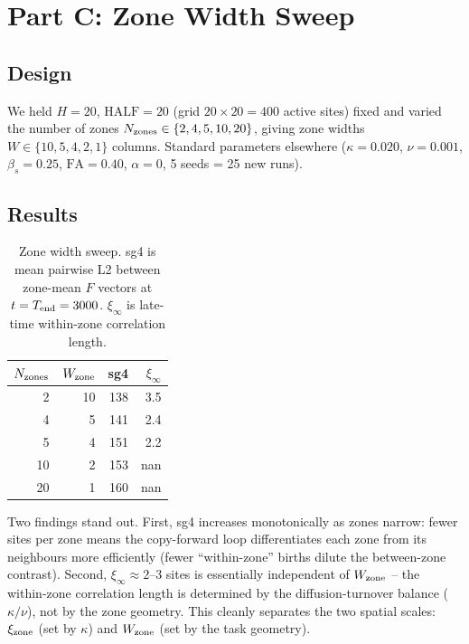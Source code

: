 \documentclass[11pt,a4paper]{article}
\begin{document}
\section{Part C: Zone Width Sweep}
\label{sec:partC}

\subsection{Design}

We held $H=20$, $\mathrm{HALF}=20$ (grid $20 \times 20 = 400$ active sites)
fixed and varied the number of zones $N_{\rm zones} \in \{2, 4, 5, 10, 20\}$,
giving zone widths $W \in \{10, 5, 4, 2, 1\}$ columns.
Standard parameters elsewhere ($\kappa=0.020$, $\nu=0.001$, $\beta_s=0.25$,
$\mathrm{FA}=0.40$, $\alpha=0$, 5 seeds = 25 new runs).

\subsection{Results}

\begin{table}[h]
\centering
\caption{Zone width sweep.  sg4 is mean pairwise L2 between zone-mean $F$
         vectors at $t=T_{\rm end}=3000$.  $\xi_\infty$ is late-time
         within-zone correlation length.}
\label{tab:zones}
\begin{tabular}{rrrr}
\toprule
$N_{\rm zones}$ & $W_{\rm zone}$ & sg4 & $\xi_\infty$ \\
\midrule
 2 & 10 & 138 & 3.5 \\
 4 &  5 & 141 & 2.4 \\
 5 &  4 & 151 & 2.2 \\
10 &  2 & 153 & nan \\
20 &  1 & 160 & nan \\
\bottomrule
\end{tabular}
\end{table}

Two findings stand out.  First, sg4 increases monotonically as zones narrow:
fewer sites per zone means the copy-forward loop differentiates each zone from
its neighbours more efficiently (fewer ``within-zone'' births dilute the
between-zone contrast).  Second, $\xi_\infty \approx 2$--$3$ sites is
essentially independent of $W_{\rm zone}$ -- the within-zone correlation
length is determined by the diffusion-turnover balance ($\kappa/\nu$), not by
the zone geometry.  This cleanly separates the two spatial scales:
$\xi_{\rm zone}$ (set by $\kappa$) and $W_{\rm zone}$ (set by the task geometry).
\end{document}
